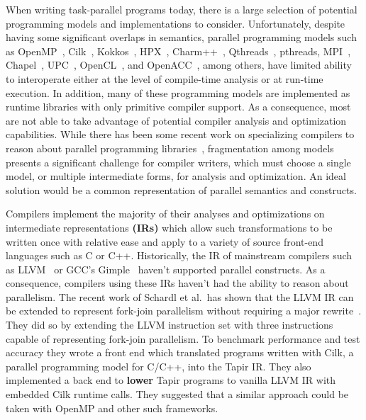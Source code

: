 \documentclass[sigconf]{acmart}
\newcommand{\wmnote}[1]{{\scriptsize \color{red} [[ Billy: #1]]}}
\newcommand{\gsnote}[1]{{\scriptsize \color{blue} [[ George: #1]]}}
\begin{document}
When writing task-parallel programs today, there is a large selection of
potential programming models and implementations to consider. Unfortunately, 
despite having some significant overlaps in semantics, parallel programming
models such as OpenMP~\cite{openmp}, Cilk~\cite{cilk}, Kokkos~\cite{kokkos},
HPX~\cite{hpx}, Charm++~\cite{charm}, Qthreads~\cite{qthreads},
pthreads\cite{pthreads}, MPI~\cite{mpi}, Chapel~\cite{chapel}, UPC~\cite{upc},
OpenCL~\cite{opencl}, and OpenACC~\cite{openacc}, among others, have limited ability to
interoperate either at the level of compile-time analysis or at run-time
execution. In addition, many of these programming models are implemented as
runtime libraries with only primitive compiler support. As a consequence, most are
not able to take advantage of potential compiler analysis and optimization
capabilities.  While there has been some recent work on specializing
compilers to reason about parallel programming libraries~\cite{Moss_2016},
fragmentation among models presents a significant challenge for compiler
writers, which must choose a single model, or multiple intermediate forms, for
analysis and optimization. An ideal solution would be a 
common representation of parallel semantics and constructs.



Compilers implement the majority of their analyses and optimizations on
intermediate representations \textbf{(IRs)} which allow such transformations
to be written once with relative ease and apply to a variety of source
front-end languages such as C or C++.  Historically, the IR of mainstream
compilers such as LLVM~\cite{lattner2004llvm} or GCC's
Gimple~\cite{merrill2003generic} haven't supported parallel constructs. As a
consequence, compilers using these IRs haven't had the ability to reason
about parallelism. The recent work of Schardl et al.\ has shown
that the LLVM IR can be extended to represent fork-join parallelism without
requiring a major rewrite~\cite{tapir}.  They did so by extending the LLVM instruction set
with three instructions capable of representing fork-join parallelism. To
benchmark performance and test accuracy they wrote a front end which translated
programs written with Cilk, a parallel programming model for C/C++, into the
Tapir IR. They also implemented a back end to \textbf{lower} Tapir programs to
vanilla LLVM IR with embedded Cilk runtime calls. They suggested that a similar
approach could be taken with OpenMP and other such frameworks.
\end{document}
